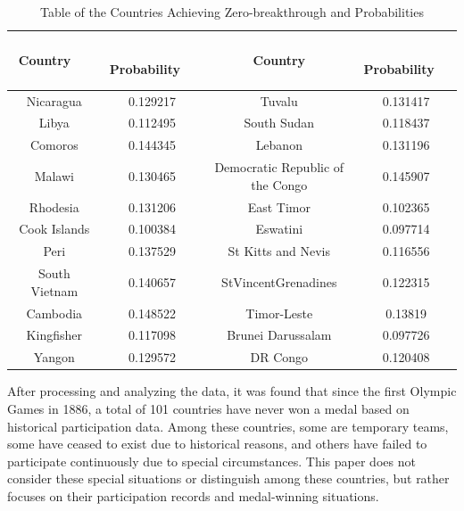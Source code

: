 \documentclass{mcmthesis}
\begin{document}
\begin{table}
\centering
\caption{Table of the Countries Achieving Zero-breakthrough and  Probabilities}
\begin{tabular}{|c|c|c|c|} 
\hline
\textbf{~ ~ ~ Country~ ~ ~~} & \textbf{~ Probability~~} & \textbf{Country}                 & \textbf{~ Probability~~}  \\ 
\hline
Nicaragua                    & 0.129217                 & Tuvalu                           & 0.131417                  \\ 
\hline
Libya                        & 0.112495                 & South Sudan                      & 0.118437                  \\ 
\hline
Comoros                      & 0.144345                 & Lebanon                          & 0.131196                  \\ 
\hline
Malawi                       & 0.130465                 & Democratic Republic of the Congo & 0.145907                  \\ 
\hline
Rhodesia                     & 0.131206                 & East Timor                       & 0.102365                  \\ 
\hline
Cook Islands                 & 0.100384                 & Eswatini                         & 0.097714                  \\ 
\hline
Peri                         & 0.137529                 & St Kitts and Nevis               & 0.116556                  \\ 
\hline
South Vietnam                & 0.140657                 & StVincentGrenadines              & 0.122315                  \\ 
\hline
Cambodia                     & 0.148522                 & Timor-Leste                      & 0.13819                   \\ 
\hline
Kingfisher                   & 0.117098                 & Brunei Darussalam                & 0.097726                  \\ 
\hline
Yangon                       & 0.129572                 & DR Congo                         & 0.120408                  \\
\hline
\end{tabular}
\end{table}

After processing and analyzing the data, it was found that since the first Olympic Games in 1886, a total of 101 countries have never won a medal based on historical participation data. Among these countries, some are temporary teams, some have ceased to exist due to historical reasons, and others have failed to participate continuously due to special circumstances. This paper does not consider these special situations or distinguish among these countries, but rather focuses on their participation records and medal-winning situations.
\end{document}
